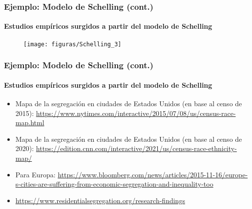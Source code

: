 \documentclass[11pt]{beamer}
\begin{document}
\begin{frame}
\frametitle{Ejemplo: Modelo de Schelling (cont.)}
\framesubtitle{Estudios empíricos surgidos a partir del modelo de Schelling} 
\begin{figure}
	\centering
	\texttt{[image: figuras/Schelling\_3]}
	\label{fig:schelling3}
\end{figure}
\end{frame}

\begin{frame}
\small
	\frametitle{Ejemplo: Modelo de Schelling (cont.)}
	\framesubtitle{Estudios empíricos surgidos a partir del modelo de Schelling} 
\begin{itemize}
    \item Mapa de la segregación en ciudades de Estados Unidos (en base al censo de 2015):
\url{https://www.nytimes.com/interactive/2015/07/08/us/census-race-map.html}
\item Mapa de la segregación en ciudades de Estados Unidos (en base al censo de 2020):
\url{https://edition.cnn.com/interactive/2021/us/census-race-ethnicity-map/}
\item Para Europa: \url{https://www.bloomberg.com/news/articles/2015-11-16/europe-s-cities-are-suffering-from-economic-segregation-and-inequality-too}\\
\item \url{https://www.residentialsegregation.org/research-findings}
\end{itemize}


\end{frame}
\end{document}

